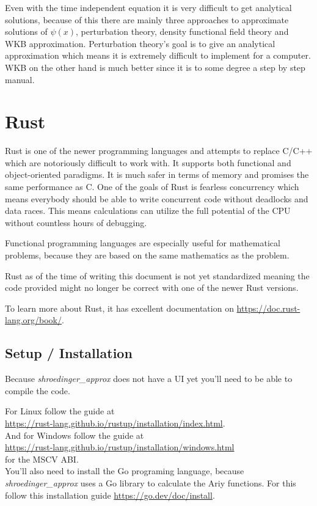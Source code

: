 \documentclass[11pt,DIV=10,final]{scrreprt} %
\begin{document}
Even with the time independent equation it is very difficult to get analytical solutions, because of this there are mainly three approaches to
approximate solutions of $\psi(x)$, perturbation theory, density functional field theory and WKB approximation. Perturbation theory's goal is to give an analytical approximation which means it
is extremely difficult to implement for a computer. WKB on the other hand is much better since it is to some degree a step by step manual.

\section{Rust}
Rust is one of the newer programming languages and attempts to replace C/C++ which are notoriously difficult to work with. It supports both functional and object-oriented paradigms. It is much safer in terms of memory and promises the same performance as C. One of the goals of Rust is fearless concurrency which means everybody should
be able to write concurrent code without deadlocks and data races. This means calculations can utilize the full potential of the CPU without countless hours of debugging.

Functional programming languages are especially useful for mathematical problems, because they are based on the same mathematics as the problem.

Rust as of the time of writing this document is not yet standardized meaning the code provided might no longer be correct with one of the newer Rust versions.

To learn more about Rust, it has excellent documentation on \url{https://doc.rust-lang.org/book/}.

\subsection{Setup / Installation}
Because \emph{shroedinger\_approx} does not have a UI yet you'll need to be able to compile
the code.

For Linux follow the guide at \\
\url{https://rust-lang.github.io/rustup/installation/index.html}.
\\[3ex]
And for Windows follow the guide at \\
\url{https://rust-lang.github.io/rustup/installation/windows.html}\\
for the MSCV ABI.
\\[3ex]
You'll also need to install the Go programing language, because \emph{shroedinger\_approx} uses a Go library to calculate the Ariy functions.
For this follow this installation guide \url{https://go.dev/doc/install}.
\end{document}
